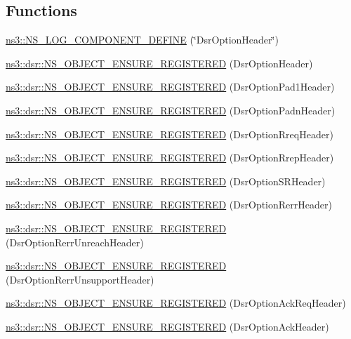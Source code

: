 \subsection*{Functions}
\begin{DoxyCompactItemize}
\item 
\hyperlink{namespacens3_af3214bcaa3cc1b7bbc1b13aad79b52b7}{ns3\+::\+N\+S\+\_\+\+L\+O\+G\+\_\+\+C\+O\+M\+P\+O\+N\+E\+N\+T\+\_\+\+D\+E\+F\+I\+NE} (\char`\"{}Dsr\+Option\+Header\char`\"{})
\item 
\hyperlink{namespacens3_1_1dsr_a5cc989f7e0e6ec5eefc4748427082ecb}{ns3\+::dsr\+::\+N\+S\+\_\+\+O\+B\+J\+E\+C\+T\+\_\+\+E\+N\+S\+U\+R\+E\+\_\+\+R\+E\+G\+I\+S\+T\+E\+R\+ED} (Dsr\+Option\+Header)
\item 
\hyperlink{namespacens3_1_1dsr_af6ebc1cf619ef4aee0933427f00714dc}{ns3\+::dsr\+::\+N\+S\+\_\+\+O\+B\+J\+E\+C\+T\+\_\+\+E\+N\+S\+U\+R\+E\+\_\+\+R\+E\+G\+I\+S\+T\+E\+R\+ED} (Dsr\+Option\+Pad1\+Header)
\item 
\hyperlink{namespacens3_1_1dsr_a77bf292cc2f86583ece59fcf8952a8d7}{ns3\+::dsr\+::\+N\+S\+\_\+\+O\+B\+J\+E\+C\+T\+\_\+\+E\+N\+S\+U\+R\+E\+\_\+\+R\+E\+G\+I\+S\+T\+E\+R\+ED} (Dsr\+Option\+Padn\+Header)
\item 
\hyperlink{namespacens3_1_1dsr_a61b9c32ae15c65914ff0ad5971a86e7b}{ns3\+::dsr\+::\+N\+S\+\_\+\+O\+B\+J\+E\+C\+T\+\_\+\+E\+N\+S\+U\+R\+E\+\_\+\+R\+E\+G\+I\+S\+T\+E\+R\+ED} (Dsr\+Option\+Rreq\+Header)
\item 
\hyperlink{namespacens3_1_1dsr_af23d495bfe2cf1157a17ffa8a72d6389}{ns3\+::dsr\+::\+N\+S\+\_\+\+O\+B\+J\+E\+C\+T\+\_\+\+E\+N\+S\+U\+R\+E\+\_\+\+R\+E\+G\+I\+S\+T\+E\+R\+ED} (Dsr\+Option\+Rrep\+Header)
\item 
\hyperlink{namespacens3_1_1dsr_a651913af35ebe9906b2efd0c16995fa5}{ns3\+::dsr\+::\+N\+S\+\_\+\+O\+B\+J\+E\+C\+T\+\_\+\+E\+N\+S\+U\+R\+E\+\_\+\+R\+E\+G\+I\+S\+T\+E\+R\+ED} (Dsr\+Option\+S\+R\+Header)
\item 
\hyperlink{namespacens3_1_1dsr_a5e6cded82673136c4def23c630e0b17f}{ns3\+::dsr\+::\+N\+S\+\_\+\+O\+B\+J\+E\+C\+T\+\_\+\+E\+N\+S\+U\+R\+E\+\_\+\+R\+E\+G\+I\+S\+T\+E\+R\+ED} (Dsr\+Option\+Rerr\+Header)
\item 
\hyperlink{namespacens3_1_1dsr_aa2b4c8725254c57b0838c95e901b9502}{ns3\+::dsr\+::\+N\+S\+\_\+\+O\+B\+J\+E\+C\+T\+\_\+\+E\+N\+S\+U\+R\+E\+\_\+\+R\+E\+G\+I\+S\+T\+E\+R\+ED} (Dsr\+Option\+Rerr\+Unreach\+Header)
\item 
\hyperlink{namespacens3_1_1dsr_a90d4886c6571ff461306ab0812c0c00c}{ns3\+::dsr\+::\+N\+S\+\_\+\+O\+B\+J\+E\+C\+T\+\_\+\+E\+N\+S\+U\+R\+E\+\_\+\+R\+E\+G\+I\+S\+T\+E\+R\+ED} (Dsr\+Option\+Rerr\+Unsupport\+Header)
\item 
\hyperlink{namespacens3_1_1dsr_abb95d64b13f38269f9751126928ecc80}{ns3\+::dsr\+::\+N\+S\+\_\+\+O\+B\+J\+E\+C\+T\+\_\+\+E\+N\+S\+U\+R\+E\+\_\+\+R\+E\+G\+I\+S\+T\+E\+R\+ED} (Dsr\+Option\+Ack\+Req\+Header)
\item 
\hyperlink{namespacens3_1_1dsr_a2ddbb9a3b55fd4728f1ca7a2f8cdaea5}{ns3\+::dsr\+::\+N\+S\+\_\+\+O\+B\+J\+E\+C\+T\+\_\+\+E\+N\+S\+U\+R\+E\+\_\+\+R\+E\+G\+I\+S\+T\+E\+R\+ED} (Dsr\+Option\+Ack\+Header)
\end{DoxyCompactItemize}

